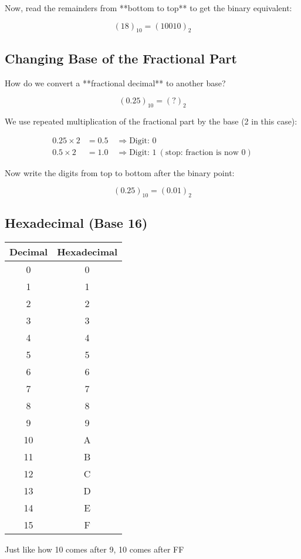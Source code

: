 \documentclass{article}
\begin{document}
Now, read the remainders from **bottom to top** to get the binary equivalent:

\[
(18)_{10} = (10010)_2
\]


\subsection{Changing Base of the Fractional Part}

How do we convert a **fractional decimal** to another base?

\[
(0.25)_{10} = (?)_2
\]

We use repeated multiplication of the fractional part by the base (2 in this case):

\begin{align*}
0.25 \times 2 &= 0.5 \quad \Rightarrow \text{Digit: } 0 \\
0.5 \times 2  &= 1.0 \quad \Rightarrow \text{Digit: } 1 \ (\text{stop: fraction is now 0})
\end{align*}

Now write the digits from top to bottom after the binary point:

\[
(0.25)_{10} = (0.01)_2
\]

\subsection*{Hexadecimal (Base 16)}
\begin{center}
\begin{tabular}{|c|c|}
\hline
\textbf{Decimal} & \textbf{Hexadecimal} \\
\hline
0  & 0 \\
1  & 1 \\
2  & 2 \\
3  & 3 \\
4  & 4 \\
5  & 5 \\
6  & 6 \\
7  & 7 \\
8  & 8 \\
9  & 9 \\
10 & A \\
11 & B \\
12 & C \\
13 & D \\
14 & E \\
15 & F \\
\hline
\end{tabular}
\end{center}

Just like how 10 comes after 9, 10 comes after FF
\end{document}
